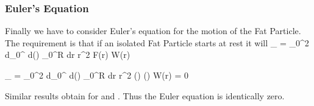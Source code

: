 \documentclass{article}
\begin{document}
\subsubsection{Euler's Equation}

Finally we have to consider Euler's equation for the motion of the Fat Particle.
The requirement is that if an isolated Fat Particle starts at rest it will
\bes
 _{\mO} = \int_{0}^{2\gp} d\gf \int_0^{\gp} d\gq \sin(\gq) \int_0^R dr \nudge
                   r^2 F(r) W(r)
\ees

\bes
  _{\mO} = \int_{0}^{2\gp} d\gf \int_0^{\gp}
  d\gq \sin(\gq) \int_0^R dr \nudge r^2  \sin(\gq) \cos(\gf) W(r) = 0
\ees

Similar results obtain for  and .  Thus the Euler
equation is identically zero.
\end{document}
